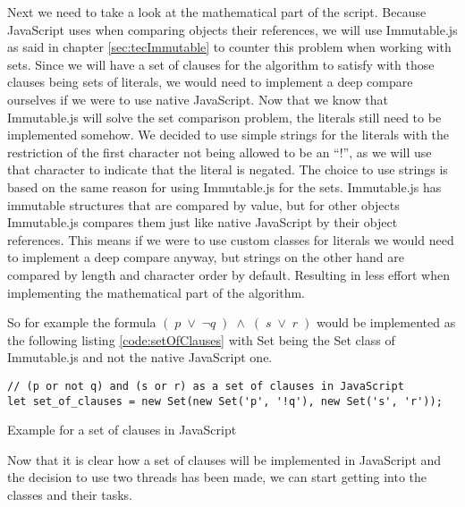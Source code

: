 Next we need to take a look at the mathematical part of the script. Because JavaScript uses when comparing objects their references, we will use Immutable.js as said in chapter \ref{sec:tecImmutable} to counter this problem when working with sets. Since we will have a set of clauses for the algorithm to satisfy with those clauses being sets of literals, we would need to implement a deep compare ourselves if we were to use native JavaScript. Now that we know that Immutable.js will solve the set comparison problem, the literals still need to be implemented somehow. We decided to use simple strings for the literals with the restriction of the first character not being allowed to be an ``!'', as we will use that character to indicate that the literal is negated. The choice to use strings is based on the same reason for using Immutable.js for the sets. Immutable.js has immutable structures that are compared by value, but for other objects Immutable.js compares them just like native JavaScript by their object references. This means if we were to use custom classes for literals we would need to implement a deep compare anyway, but strings on the other hand are compared by length and character order by default. Resulting in less effort when implementing the mathematical part of the algorithm.

So for example the formula $(\; p\; \lor\; \neg q\; )\; \land\; (\; s\; \lor\; r\; )$ would be implemented as the following listing \ref{code:setOfClauses} with Set being the Set class of Immutable.js and not the native JavaScript one.

\begin{listing}[h!]
\begin{verbatim}
// (p or not q) and (s or r) as a set of clauses in JavaScript
let set_of_clauses = new Set(new Set('p', '!q'), new Set('s', 'r'));
\end{verbatim}
    \caption{Example for a set of clauses in JavaScript}
    \label{code:setOfClauses}
\end{listing}

Now that it is clear how a set of clauses will be implemented in JavaScript and the decision to use two threads has been made, we can start getting into the classes and their tasks.

